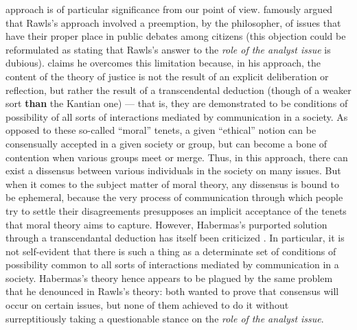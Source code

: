 \documentclass[a4paper, 11pt]{article}
\begin{document}
 approach is of particular significance from our point of view. \citet{habermas_short_1999} famously argued that Rawls’s approach involved a preemption, by the philosopher, of issues that have their proper place in public debates among citizens (this objection could be reformulated as stating that Rawls’s answer to the \emph{role of the analyst issue} is dubious).
\citet{habermas_moralbewustsein_1983} claims he overcomes this limitation because, in his approach, the content of the theory of justice is not the result of an explicit deliberation or reflection, but rather the result of a transcendental deduction (though of a weaker sort \textbf{than} the Kantian one) --- that is, they are demonstrated to be conditions of possibility of all sorts of interactions mediated by communication in a society. As opposed to these so-called “moral” tenets, a given “ethical” notion can be consensually accepted in a given society or group, but can become a bone of contention when various groups meet or merge. 
Thus, in this approach, there can exist a dissensus between various individuals in the society on many issues. 
But when it comes to the subject matter of moral theory, any dissensus is bound to be ephemeral, because the very process of communication through which people try to settle their disagreements presupposes an implicit acceptance of the tenets that moral theory aims to capture. However, Habermas’s purported solution through a transcendantal deduction has itself been criticized \citep{heath_communicative_2001}. 
In particular, it is not self-evident that there is such a thing as a determinate set of conditions of possibility common to all sorts of interactions mediated by communication in a society. 
Habermas’s theory hence appears to be plagued by the same problem that he denounced in Rawls’s theory: both wanted to prove that consensus will occur on certain issues, but none of them achieved to do it without surreptitiously taking a questionable stance on the \emph{role of the analyst issue}. %
\end{document}
